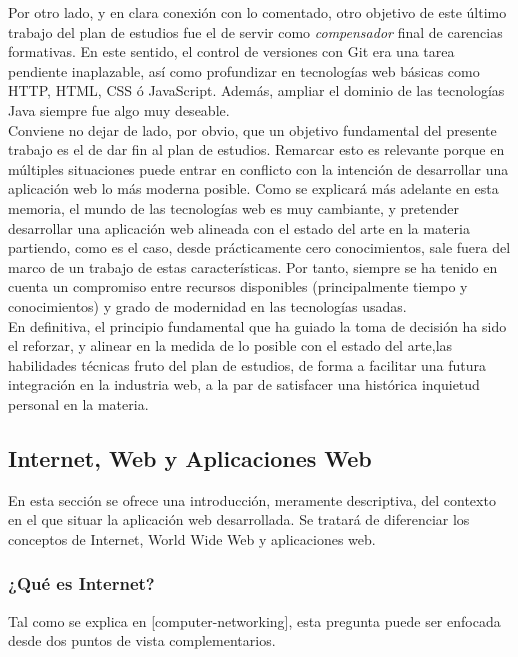 \documentclass[a4paper]{report}
\begin{document}
    Por otro lado, y en clara conexión con lo comentado, otro objetivo de este último trabajo del plan de estudios fue el de servir como \emph{compensador} final de carencias formativas. En este sentido, el control de versiones con Git era una tarea pendiente inaplazable, así como profundizar en tecnologías web básicas como HTTP, HTML, CSS ó JavaScript. Además, ampliar el dominio de las tecnologías Java siempre fue algo muy deseable.
    \\

    Conviene no dejar de lado, por obvio, que un objetivo fundamental del presente trabajo es el de dar fin al plan de estudios. Remarcar esto es relevante porque en múltiples situaciones puede entrar en conflicto con la intención de desarrollar una aplicación web lo más moderna posible. Como se explicará más adelante en esta memoria, el mundo de las tecnologías web es muy cambiante, y pretender desarrollar una aplicación web alineada con el estado del arte en la materia partiendo, como es el caso, desde prácticamente cero conocimientos, sale fuera del marco de un trabajo de estas características. Por tanto, siempre se ha tenido en cuenta un compromiso entre recursos disponibles (principalmente tiempo y conocimientos) y grado de modernidad en las tecnologías usadas.
    \\
    
    En definitiva, el principio fundamental que ha guiado la toma de decisión ha sido el reforzar, y alinear en la medida de lo posible con el estado del arte,las habilidades técnicas fruto del plan de estudios, de forma a facilitar una futura integración en la industria web, a la par de satisfacer una histórica inquietud personal en la materia.


    \subsection{Internet, Web y Aplicaciones Web}
    En esta sección se ofrece una introducción, meramente descriptiva, del contexto en el que situar la aplicación web desarrollada. Se tratará de diferenciar los conceptos de Internet, World Wide Web y aplicaciones web.

    \subsubsection{¿Qué es Internet?}
    Tal como se explica en [computer-networking], esta pregunta puede ser enfocada desde dos puntos de vista complementarios.
    \\
\end{document}
